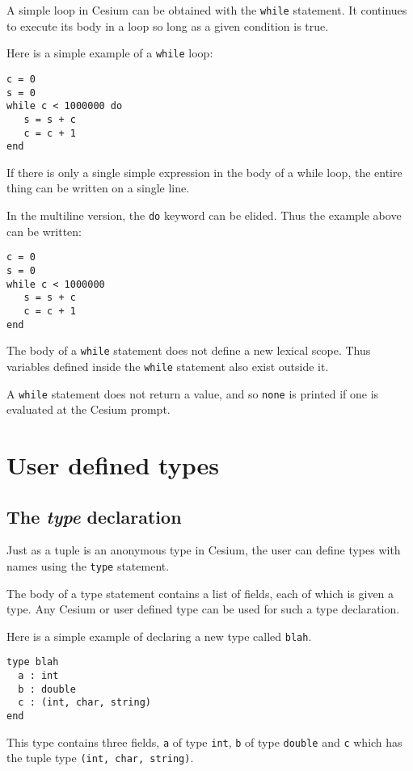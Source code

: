 \documentclass[a4paper,10pt]{article}
\newcommand{\code}{\lstinline}
\begin{document}
{A simple loop in Cesium can be obtained with the \code{while} statement. It continues to execute its
body in a loop so long as a given condition is true.

Here is a simple example of a \code{while} loop:

\begin{lstlisting}
c = 0
s = 0
while c < 1000000 do
   s = s + c
   c = c + 1
end
\end{lstlisting}

If there is only a single simple expression in the body of a while loop, the entire thing can be
written on a single line. 

In the multiline version, the \code{do} keyword can be elided. Thus the example above can be written:

\begin{lstlisting}
c = 0
s = 0
while c < 1000000
   s = s + c
   c = c + 1
end
\end{lstlisting}

The body of a \code{while} statement does not define a new lexical scope. Thus variables defined 
inside the \code{while} statement also exist outside it.

A \code{while} statement does not return a value, and so \code{none} is printed if one is evaluated
at the Cesium prompt.

\section{User defined types}

\subsection{The \textit{type} declaration}

Just as a tuple is an anonymous type in Cesium, the user can define types with names using the
\code{type} statement.

The body of a type statement contains a list of fields, each of which is given a type. Any Cesium
or user defined type can be used for such a type declaration.

Here is a simple example of declaring a new type called \code{blah}.

\begin{lstlisting}
type blah
  a : int
  b : double
  c : (int, char, string)
end
\end{lstlisting}

This type contains three fields, \code{a} of type \code{int}, \code{b} of type \code{double} and
\code{c} which has the tuple type \code{(int, char, string)}.

}
\end{document}
